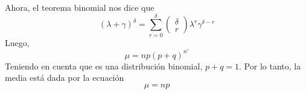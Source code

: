 \documentclass[12pt]{article}
\begin{document}
                \newpage Ahora, el teorema binomial nos dice que 
                \begin{equation}
                	{ \left( \lambda +\gamma  \right)  }^{ \delta  }=\sum _{ r=0 }^{ \delta  }{ \left( \begin{matrix} \delta  \\ r \end{matrix} \right) { \lambda  }^{ r }{ \gamma  }^{ \delta -r } } 
                \end{equation}
                Luego,
                \begin{equation*}
                	\mu =np(p+q)^{n'}
                \end{equation*}
                Teniendo en cuenta que es una distribución binomial, $p+q=1$. Por lo tanto, la media está dada por la ecuación
                \begin{equation}
                	\mu=np
                \end{equation}
                
\end{document}
